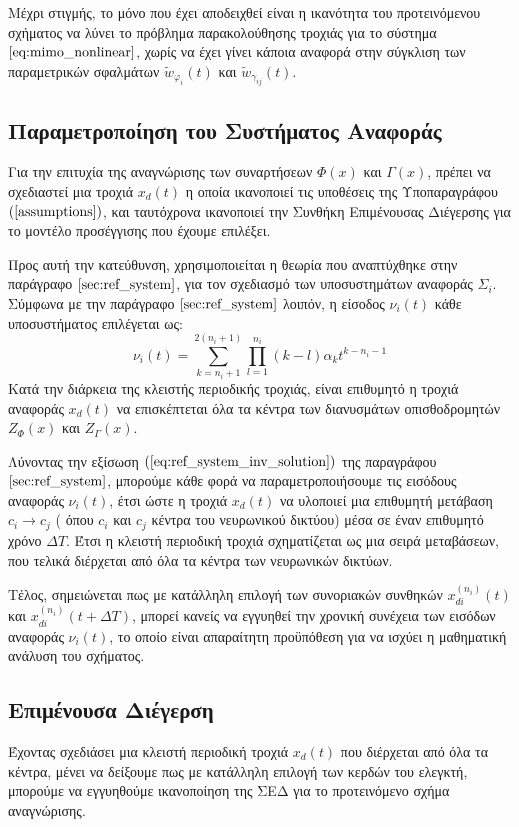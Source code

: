 Μέχρι στιγμής, το μόνο που έχει αποδειχθεί είναι η ικανότητα του προτεινόμενου σχήματος να λύνει το πρόβλημα παρακολούθησης τροχιάς για το σύστημα $\ref{eq:mimo_nonlinear}$, χωρίς να έχει γίνει κάποια αναφορά στην σύγκλιση των παραμετρικών σφαλμάτων $\tilde{w}_{\varphi_i}(t)$ και $\tilde{w}_{\gamma_{ij}}(t)$.

\subsection{Παραμετροποίηση του Συστήματος Αναφοράς}
\label{subsec:schema_ref_parameterization}
Για την επιτυχία της αναγνώρισης των συναρτήσεων $\Phi(x)$ και $\Gamma(x)$, πρέπει να σχεδιαστεί μια τροχιά $x_d(t)$ η οποία ικανοποιεί τις υποθέσεις της Υποπαραγράφου $(\ref{assumptions})$, και ταυτόχρονα ικανοποιεί την Συνθήκη Επιμένουσας Διέγερσης για το μοντέλο προσέγγισης που έχουμε επιλέξει.

Προς αυτή την κατεύθυνση, χρησιμοποιείται η θεωρία που αναπτύχθηκε στην παράγραφο $\ref{sec:ref_system}$, για τον σχεδιασμό των υποσυστημάτων αναφοράς $\Sigma_i$. Σύμφωνα με την παράγραφο $\ref{sec:ref_system}$ λοιπόν, η είσοδος $\nu_i(t)$ κάθε υποσυστήματος επιλέγεται ως:
\begin{equation}
	\nu_i(t) = \sum_{k=n_i + 1}^{2(n_i + 1)} \prod_{l = 1}^{n_i} (k-l) \alpha_k t^{k - n_i - 1}
\end{equation}
Κατά την διάρκεια της κλειστής περιοδικής τροχιάς, είναι επιθυμητό η τροχιά αναφοράς $x_d(t)$ να επισκέπτεται όλα τα κέντρα των διανυσμάτων οπισθοδρομητών $Z_{\Phi}(x)$ και $Z_{\Gamma}(x)$. 

Λύνοντας την εξίσωση $(\ref{eq:ref_system_inv_solution})$ της παραγράφου $\ref{sec:ref_system}$, μπορούμε κάθε φορά να παραμετροποιήσουμε τις εισόδους αναφοράς $\nu_i(t)$, έτσι ώστε η τροχιά $x_d(t)$ να υλοποιεί μια επιθυμητή μετάβαση $c_i \rightarrow c_j$ ( όπου $c_i$ και $c_j$ κέντρα του νευρωνικού δικτύου) μέσα σε έναν επιθυμητό χρόνο $\Delta T$. Έτσι η κλειστή περιοδική τροχιά σχηματίζεται ως μια σειρά μεταβάσεων, που τελικά διέρχεται από όλα τα κέντρα των νευρωνικών δικτύων.

Τέλος, σημειώνεται πως με κατάλληλη επιλογή των συνοριακών συνθηκών $x_{di}^{(n_i)}(t)$ και $x_{di}^{(n_i)}(t+ \Delta T)$, μπορεί κανείς να εγγυηθεί την χρονική συνέχεια των εισόδων αναφοράς $\nu_i(t)$, το οποίο είναι απαραίτητη προϋπόθεση για να ισχύει η μαθηματική ανάλυση του σχήματος.

\subsection{Επιμένουσα Διέγερση}
Έχοντας σχεδιάσει μια κλειστή περιοδική τροχιά $x_d(t)$ που διέρχεται από όλα τα κέντρα, μένει να δείξουμε πως με κατάλληλη επιλογή των κερδών του ελεγκτή, μπορούμε να εγγυηθούμε ικανοποίηση της ΣΕΔ για το προτεινόμενο σχήμα αναγνώρισης.

